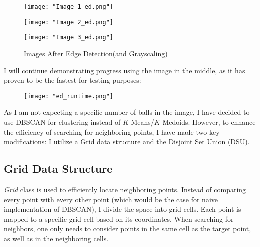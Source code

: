 \documentclass{article}
\begin{document}
	\begin{figure}[H]
		\centering
		\begin{minipage}{0.3\textwidth}
			\centering
			\texttt{[image: "Image 1\_ed.png"]}
		\end{minipage}%
		\hspace{0.05\textwidth}
		\begin{minipage}{0.25\textwidth}
			\centering
			\texttt{[image: "Image 2\_ed.png"]}
		\end{minipage}%
		\hspace{0.05\textwidth} 
		\begin{minipage}{0.25\textwidth}
			\centering
			\texttt{[image: "Image 3\_ed.png"]}
		\end{minipage}
		\caption{Images After Edge Detection(and Grayscaling)}
	\end{figure}
	
	I will continue demonstrating progress using the image in the middle, as it has proven to be the fastest for testing purposes:
	
	\begin{figure}[H]
		\centering
		\texttt{[image: "ed\_runtime.png"]}
	\end{figure}
	
	As I am not expecting a specific number of balls in the image, I have decided to use DBSCAN for clustering instead of $K$-Means/$K$-Medoids. However, to enhance the efficiency of searching for neighboring points, I have made two key modifications: I utilize a Grid data structure and the Disjoint Set Union (DSU).
	
	\subsection*{Grid Data Structure}
	
	\textit{Grid} class is used to efficiently locate neighboring points. Instead of comparing every point with every other point (which would be the case for naive implementation of DBSCAN), I divide the space into grid cells. Each point is mapped to a specific grid cell based on its coordinates. When searching for neighbors, one only needs to consider points in the same cell as the target point, as well as in the neighboring cells.
	
\end{document}
